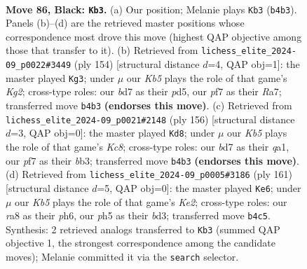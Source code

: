\documentclass[11pt]{article}
\begin{document}
\clearpage

\begin{figure}[p]\centering
\begin{subfigure}{0.46\textwidth}\centering
\resizebox{\linewidth}{!}{%
\newchessgame
\chessboard[
  setfen={R7/3B1P2/8/7P/1k6/8/7K/8 b - - 4 86},
  showmover=false,
  pgfstyle=straightmove, color=movearrow, markmove={b4-b3}
]}
\caption{}
\end{subfigure}\hfill
\begin{subfigure}{0.46\textwidth}\centering
\resizebox{\linewidth}{!}{%
\newchessgame
\chessboard[
  setfen={8/R7/8/3p4/8/3k4/6K1/2r5 w - - 41 78},
  showmover=false,
  pgfstyle=straightmove, color=movearrow, markmove={g2-g3}
]}
\caption{}
\end{subfigure}
\\[4pt]
\begin{subfigure}{0.46\textwidth}\centering
\resizebox{\linewidth}{!}{%
\newchessgame
\chessboard[
  setfen={2K5/8/2k5/8/5p1p/1b6/8/q7 w - - 0 79},
  showmover=false,
  pgfstyle=straightmove, color=movearrow, markmove={c8-d8}
]}
\caption{}
\end{subfigure}\hfill
\begin{subfigure}{0.46\textwidth}\centering
\resizebox{\linewidth}{!}{%
\newchessgame
\chessboard[
  setfen={8/4k3/2K4P/8/6p1/3B2B1/8/8 b - - 0 81},
  showmover=false,
  pgfstyle=straightmove, color=movearrow, markmove={e7-e6}
]}
\caption{}
\end{subfigure}
\caption{\textbf{Move 86, Black: \texttt{Kb3}.} (a) Our position; Melanie plays \texttt{Kb3} (\texttt{b4b3}). Panels (b)--(d) are the retrieved master positions whose correspondence most drove this move (highest QAP objective among those that transfer to it). (b) Retrieved from \texttt{lichess\_elite\_2024-09\_p0022\#3449} (ply 154) [structural distance $d$=4, QAP obj=1]: the master played \texttt{Kg3}; under $\mu$ our \emph{Kb5} plays the role of that game's \emph{Kg2}; cross-type roles: our \emph{b}d7 as their \emph{p}d5, our \emph{p}f7 as their \emph{R}a7; transferred move \texttt{b4b3} \textbf{(endorses this move)}. (c) Retrieved from \texttt{lichess\_elite\_2024-09\_p0021\#2148} (ply 156) [structural distance $d$=3, QAP obj=0]: the master played \texttt{Kd8}; under $\mu$ our \emph{Kb5} plays the role of that game's \emph{Kc8}; cross-type roles: our \emph{b}d7 as their \emph{q}a1, our \emph{p}f7 as their \emph{b}b3; transferred move \texttt{b4b3} \textbf{(endorses this move)}. (d) Retrieved from \texttt{lichess\_elite\_2024-09\_p0005\#3186} (ply 161) [structural distance $d$=5, QAP obj=0]: the master played \texttt{Ke6}; under $\mu$ our \emph{Kb5} plays the role of that game's \emph{Ke2}; cross-type roles: our \emph{r}a8 as their \emph{p}h6, our \emph{p}h5 as their \emph{b}d3; transferred move \texttt{b4c5}. Synthesis: 2 retrieved analogs transferred to \texttt{Kb3} (summed QAP objective 1, the strongest correspondence among the candidate moves); Melanie committed it via the \texttt{search} selector.}
\label{fig:thought-m171}
\end{figure}
\end{document}

